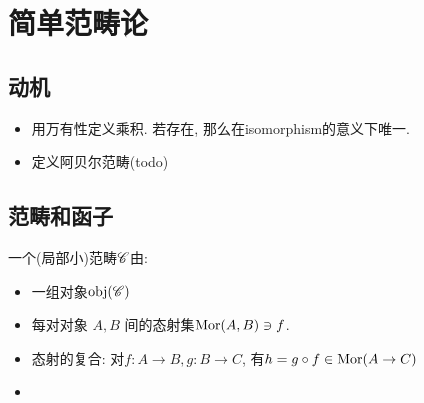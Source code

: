 \section{简单范畴论}

\subsection{动机}
\begin{itemize}
    \item  用万有性定义乘积. 
        若存在, 那么在isomorphism的意义下唯一. 
    \item  定义阿贝尔范畴(todo)
\end{itemize}

\subsection{范畴和函子}
\begin{defi}
    一个(局部小)范畴\(\mathscr C\)由: 
    \begin{itemize}
        \item 一组对象\(\operatorname{obj}(\mathscr C)\)
        \item 每对对象 \(A,B\) 间的态射集\(\operatorname{Mor}(A,B)\ni f\). 
        \item 态射的复合: 对\(f : A\to B, g: B\to C\), 有\(h = g\circ f \in \operatorname{Mor}(A\to C)\)
        \item 
    \end{itemize}
\end{defi}